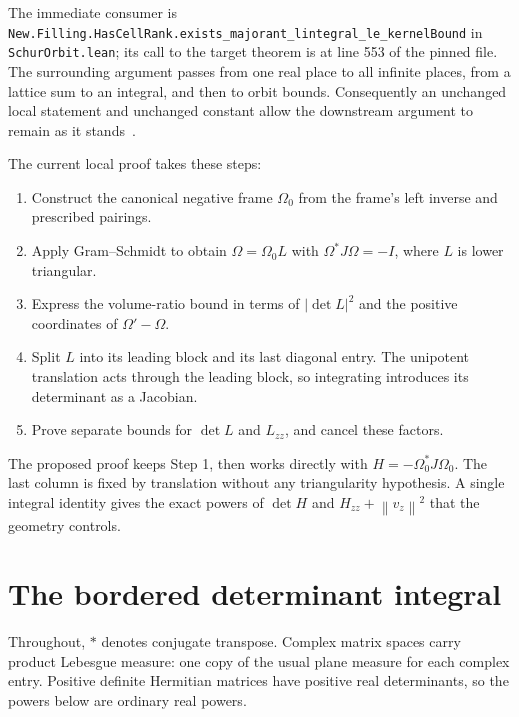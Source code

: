 \documentclass[11pt,letterpaper]{article}
\theoremstyle{remark}
\newcommand{\Id}{I}
\newcommand{\norm}[1]{\left\lVert#1\right\rVert}
\newcommand{\abs}[1]{\left|#1\right|}
\newcommand{\code}[1]{{\small\urlstyle{tt}\nolinkurl{#1}}}
\begin{document}
The immediate consumer is
\code{New.Filling.HasCellRank.exists_majorant_lintegral_le_kernelBound}
in \code{SchurOrbit.lean}; its call to the target theorem is at line 553 of the
pinned file. The surrounding argument passes from one real place to all infinite
places, from a lattice sum to an integral, and then to orbit bounds. Consequently
an unchanged local statement and unchanged constant allow the downstream
argument to remain as it stands~\cite{consumer}.

The current local proof takes these steps:

\begin{enumerate}
\item Construct the canonical negative frame $\Omega_0$ from the frame's left
inverse and prescribed pairings.
\item Apply Gram--Schmidt to obtain $\Omega=\Omega_0L$ with
$\Omega^*J\Omega=-\Id$, where $L$ is lower triangular.
\item Express the volume-ratio bound in terms of $\abs{\det L}^2$ and the
positive coordinates of $\Omega'-\Omega$.
\item Split $L$ into its leading block and its last diagonal entry. The
unipotent translation acts through the leading block, so integrating introduces
its determinant as a Jacobian.
\item Prove separate bounds for $\det L$ and $L_{zz}$, and cancel these factors.
\end{enumerate}

The proposed proof keeps Step 1, then works directly with
$H=-\Omega_0^*J\Omega_0$. The last column is fixed by translation without any
triangularity hypothesis. A single integral identity gives the exact powers of
$\det H$ and $H_{zz}+\norm{v_z}^2$ that the geometry controls.

\section{The bordered determinant integral}\label{sec:integral}

Throughout, $*$ denotes conjugate transpose. Complex matrix spaces carry product
Lebesgue measure: one copy of the usual plane measure for each complex entry.
Positive definite Hermitian matrices have positive real determinants, so the
powers below are ordinary real powers.
\end{document}
